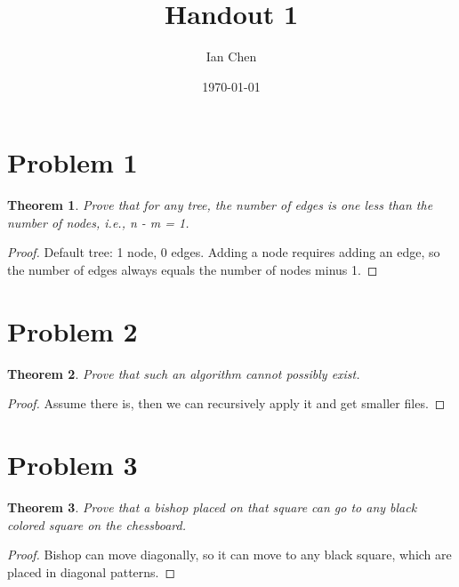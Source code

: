 \documentclass[11pt]{article}
\title{Handout 1}
\author{Ian Chen}
\date{\today}
\begin{document}
    \maketitle

    \setcounter{section}{0} %


    \section{Problem 1}\label{sec:chapter_1}

    \newtheorem{theorem}{Theorem}
    \newtheorem{exercise}[theorem]{Exercise}
    \newtheorem{corollary}[theorem]{Corollary}
    \newtheorem{question}[theorem]{Question}
    \newtheorem{lemma}[theorem]{Lemma}

    \setcounter{theorem}{0} %

    \begin{theorem}
        Prove that for any tree, the number of edges is one less than the number of nodes, i.e., n
        - m = 1.
    \end{theorem}
    \begin{proof}
        Default tree: 1 node, 0 edges. Adding a node requires adding an edge, so the number of
        edges always equals the number of nodes minus 1.
    \end{proof}


    \section{Problem 2}\label{sec:chapter_2}

    \begin{theorem}
        Prove that such an algorithm cannot possibly exist.
    \end{theorem}
    \begin{proof}
        Assume there is, then we can recursively apply it and get smaller files.
    \end{proof}


    \section{Problem 3}\label{sec:chapter_3}

    \begin{theorem}
        Prove that a bishop placed on that square can go to any black colored square on the
        chessboard.
    \end{theorem}
    \begin{proof}
        Bishop can move diagonally, so it can move to any black square, which are placed in
        diagonal patterns.
    \end{proof}
\end{document}
